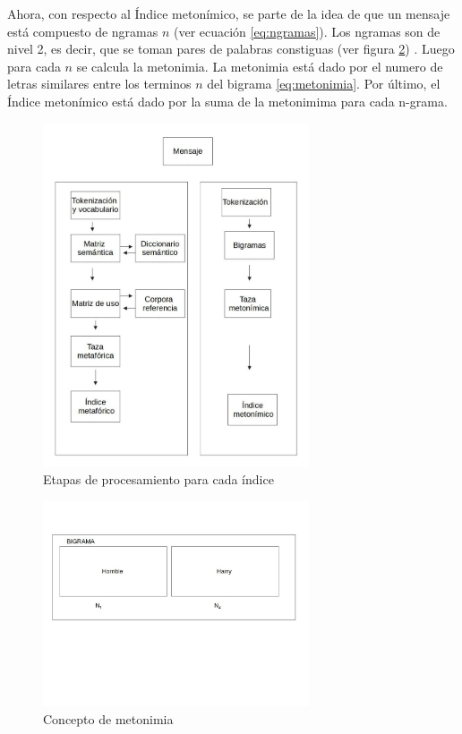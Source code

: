 \documentclass[12pt,letterpaper,twoside]{article}
\begin{document}
Ahora, con respecto al Índice metonímico, se parte de la idea de que
un mensaje está compuesto de ngramas \(n\) (ver ecuación
\ref{eq:ngramas}). Los ngramas son de nivel 2, es decir, que se toman
pares de palabras constiguas (ver figura \ref{fig:metonimia}) .  Luego
para cada \(n\) se calcula la metonimia. La metonimia está dado por el
numero de letras similares entre los terminos \(n\) del bigrama
\ref{eq:metonimia}. Por último, el Índice metonímico está dado por la
suma de la metonimima para cada n-grama.

\begin{figure}[H]
\centering
\includegraphics[width=0.7\textwidth]{./assets/metodologia.jpg}
\caption{\label{fig:metodologia}Etapas de procesamiento para cada índice}
\end{figure}

\begin{figure}[H]
\centering
\includegraphics[width=0.7\textwidth]{./assets/metonimia.jpg}
\caption{\label{fig:metonimia}Concepto de metonimia}
\end{figure}
\end{document}

